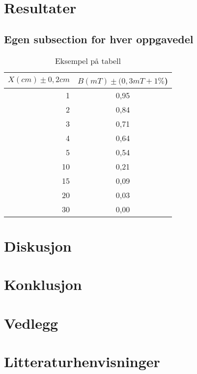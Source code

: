 \documentclass[12pt,norsk,a4paper]{article}
\begin{document}
\section{Resultater}

\subsection{Egen subsection for hver oppgavedel}


\begin{table}[H]
\begin{center}
	\begin{tabular}{ | r | c |}
	\hline
	$X(cm )\pm0,2cm$  &$B(mT)\pm(0,3mT+1\%$) \\ \hline
    1 & 0,95\\ \hline
    2 & 0,84\\ \hline
    3 & 0,71\\ \hline
    4 & 0,64\\ \hline
    5 & 0,54\\ \hline
    10 & 0,21\\ \hline
    15 & 0,09\\ \hline
    20 & 0,03\\ \hline
    30 & 0,00\\ \hline
    \hline
    \end{tabular}
    \end{center}
    \caption{Eksempel på tabell}

\end{table}
\clearpage

\section{Diskusjon}
\clearpage

\section{Konklusjon}
\clearpage

\section{Vedlegg}
\clearpage
\section{Litteraturhenvisninger}
\end{document}
